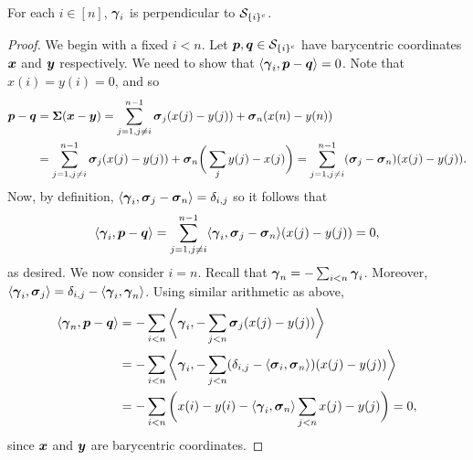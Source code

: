 \begin{claim}
For each $i\in[n]$, $\vb*{\gamma}_i$ is perpendicular to $\mathcal{S}_{\{i\}^c}$. 
\end{claim}
\begin{proof}
We begin with a fixed $i<n$. Let $\vb*{p},\vb*{q}\in\mathcal{S}_{\{i\}^c}$ have barycentric coordinates $\vb*{x}$ and $\vb*{y}$ respectively. We need to show that $\langle \vb*{\gamma}_i,\vb*{p}-\vb*{q}\rangle =0$. Note that $x(i)=y(i)=0$, and so 
\begin{align*}
    \vb*{p}-\vb*{q} &= \boldsymbol{\Sigma}(\vb*{x}-\vb*{y}) = \sum_{j=1,j\neq i}^{n-1} \vb*{\sigma}_j(x(j)-y(j)) + \vb*{\sigma}_n(x(n)-y(n)) \\
    &= \sum_{j=1,j\neq i}^{n-1} \vb*{\sigma}_j(x(j)-y(j)) + \vb*{\sigma}_n\bigg(\sum_{j}y(j)-x(j)\bigg) = \sum_{j=1,j\neq i}^{n-1} (\vb*{\sigma}_j-\vb*{\sigma}_n)(x(j)-y(j)). 
\end{align*}
Now, by definition, $\langle \vb*{\gamma}_i,\vb*{\sigma}_j-\vb*{\sigma}_n\rangle = \delta_{i,j}$ so it follows that \[\langle \vb*{\gamma}_i,\vb*{p}-\vb*{q}\rangle = \sum_{j=1,j\neq i}^{n-1}\langle \vb*{\gamma}_i,\vb*{\sigma}_j-\vb*{\sigma}_n\rangle (x(j)-y(j))=0,\]
as desired. We now consider $i=n$. Recall that $\vb*{\gamma}_n=-\sum_{i<n}\vb*{\gamma}_i$. Moreover, $\langle \vb*{\gamma}_i,\vb*{\sigma}_j\rangle = \delta_{i,j}-\langle \vb*{\gamma}_i,\vb*{\gamma}_n\rangle$. Using similar arithmetic as above, 
\begin{align*}
    \langle \vb*{\gamma}_n ,\vb*{p}-\vb*{q}\rangle &= -\sum_{i<n}\bigg\langle \vb*{\gamma}_i,-\sum_{j<n} \vb*{\sigma}_j(x(j)-y(j))\bigg\rangle \\
    &= -\sum_{i<n}\bigg\langle \vb*{\gamma}_i,-\sum_{j<n} (\delta_{i,j}-\langle \vb*{\sigma}_i,\vb*{\sigma}_n\rangle)(x(j)-y(j))\bigg\rangle \\
    &= -\sum_{i<n}\bigg(x(i)-y(i)-\langle\vb*{\gamma}_i,\vb*{\sigma}_n\rangle  \sum_{j<n} x(j)-y(j)\bigg) =0,
\end{align*}
since $\vb*{x}$ and $\vb*{y}$ are barycentric coordinates. 
\end{proof}




